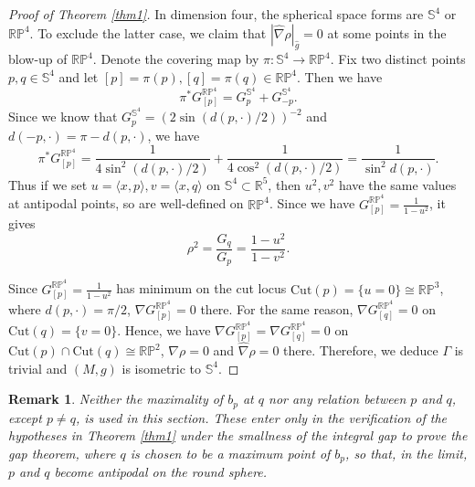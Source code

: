 \documentclass[11pt]{amsart}
\theoremstyle{plain}
\newtheorem{remark}[theorem]{Remark}
\numberwithin{equation}{section}
\newcommand{\R}{\mathbb{R}}
\renewcommand{\S}{\mathbb{S}}
\newcommand{\RP}{\mathbb{RP}}
\newcommand{\hn}{\widehat{\nabla}}
\newcommand{\hg}{\widehat{g}}
\begin{document}
\begin{proof}[Proof of Theorem \ref{thm1}]
In dimension four, the spherical space forms are $\S^4$ or $\mathbb{RP}^4$. To exclude the latter case, we claim that $|\hn\rho|_{\hg}=0$ at some points in the blow-up of $\mathbb{RP}^4$. Denote the covering map by $\pi:\S^4\rightarrow\mathbb{RP}^4$. Fix two distinct points $p,q\in\S^4$ and let $[p]=\pi(p),[q]=\pi(q)\in\RP^4$. Then we have
\begin{equation*}
\pi^\ast G_{[p]}^{\RP^4}=G_{p}^{\S^4}+G_{-p}^{\S^4}.
\end{equation*}
Since we know that $G^{\S^4}_p=(2\sin(d(p,\cdot)/2))^{-2}$ and $d(-p,\cdot)=\pi-d(p,\cdot)$, we have
\begin{equation*}
\pi^\ast G_{[p]}^{\RP^4}=\frac{1}{4\sin^2(d(p,\cdot)/2)}+\frac{1}{4\cos^2(d(p,\cdot)/2)}=\frac{1}{\sin^2d(p,\cdot)}.
\end{equation*}
Thus if we set $u=\langle x,p\rangle, v=\langle x,q\rangle$ on $\S^4\subset\R^5$, then $u^2,v^2$ have the same values at antipodal points, so are well-defined on $\RP^4$. Since we have $G_{[p]}^{\RP^4}=\frac{1}{1-u^2}$, it gives
\begin{equation*}
\rho^2=\frac{G_q}{G_p}=\frac{1-u^2}{1-v^2}.
\end{equation*}

Since $G_{[p]}^{\RP^4}=\frac{1}{1-u^2}$ has minimum on the cut locus $\mathrm{Cut}(p)=\{u=0\}\cong\RP^3$, where $d(p,\cdot)=\pi/2$, $\nabla G_{[p]}^{\RP^4}=0$ there. For the same reason, $\nabla G_{[q]}^{\RP^4}=0$ on $\mathrm{Cut}(q)=\{v=0\}$. Hence, we have $\nabla G_{[p]}^{\RP^4}=\nabla G_{[q]}^{\RP^4}=0$ on $\mathrm{Cut}(p)\cap\mathrm{Cut}(q)\cong\RP^2$, $\nabla\rho=0$ and $\hn\rho=0$ there. Therefore, we deduce $\Gamma$ is trivial and $(M,g)$ is isometric to $\S^4$.  
\end{proof}

\begin{remark}
Neither the maximality of $b_p$ at $q$ nor any relation between $p$ and $q$, except $p\neq q$, is used in this section. These enter only in the verification of the hypotheses in Theorem \ref{thm1} under the smallness of the integral gap to prove the gap theorem, where $q$ is chosen to be a maximum point of $b_p$, so that, in the limit, $p$ and $q$ become antipodal on the round sphere.
\end{remark}
\end{document}
